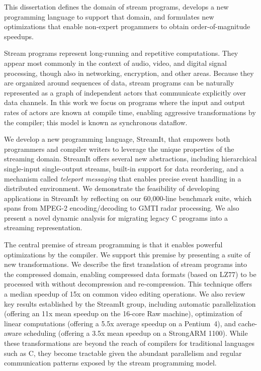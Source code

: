 This dissertation defines the domain of stream programs, develops a
new programming language to support that domain, and formulates new
optimizations that enable non-expert progammers to obtain
order-of-magnitude speedups.

Stream programs represent long-running and repetitive computations.
They appear most commonly in the context of audio, video, and digital
signal processing, though also in networking, encryption, and other
areas.  Because they are organized around sequences of data, stream
programs can be naturally represented as a graph of independent actors
that communicate explicitly over data channels.  In this work we focus
on programs where the input and output rates of actors are known at
compile time, enabling aggressive transformations by the compiler;
this model is known as synchronous dataflow.

We develop a new programming language, StreamIt, that empowers both
programmers and compiler writers to leverage the unique properties of
the streaming domain.  StreamIt offers several new abstractions,
including hierarchical single-input single-output streams, built-in
support for data reordering, and a mechanism called {\it teleport
  messaging} that enables precise event handling in a distributed
environment.  We demonstrate the feasibility of developing
applications in StreamIt by reflecting on our 60,000-line benchmark
suite, which spans from MPEG-2 encoding/decoding to GMTI radar
processing.  We also present a novel dynamic analysis for migrating
legacy C programs into a streaming representation.

The central premise of stream programming is that it enables powerful
optimizations by the compiler.  We support this premise by presenting
a suite of new transformations.  We describe the first translation of
stream programs into the compressed domain, enabling compressed data
formats (based on LZ77) to be processed with without decompression and
re-compression.  This technique offers a median speedup of 15x on
common video editing operations.  We also review key results
established by the StreamIt group, including automatic parallelization
(offering an 11x mean speedup on the 16-core Raw machine),
optimization of linear computations (offering a 5.5x average speedup
on a Pentium~4), and cache-aware scheduling (offering a 3.5x mean
speedup on a StrongARM 1100).  While these transformations are beyond
the reach of compilers for traditional languages such as C, they
become tractable given the abundant parallelism and regular
communication patterns exposed by the stream programming model.
